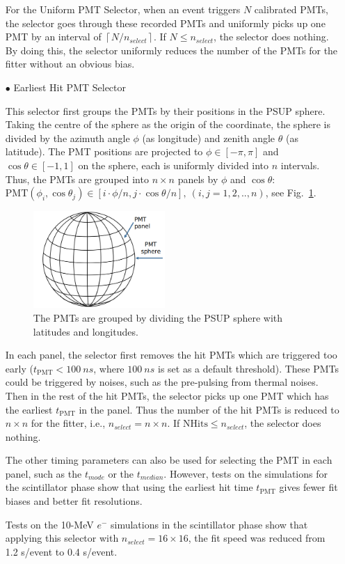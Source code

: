 \begin{itemize}
	For the Uniform PMT Selector, when an event triggers $N$ calibrated PMTs, the selector goes through these recorded PMTs and uniformly picks up one PMT by an interval of $\left \lceil{N/n_{select}}\right \rceil $. If $N\leq n_{select}$, the selector does nothing. By doing this, the selector uniformly reduces the number of the PMTs for the fitter without an obvious bias.
	
	\item[$\bullet$] Earliest Hit PMT Selector
	
	This selector first groups the PMTs by their positions in the PSUP sphere. Taking the centre of the sphere as the origin of the coordinate, the sphere is divided by the azimuth angle $\phi$ (as longitude) and zenith angle $\theta$ (as latitude). The PMT positions are projected to $\phi\in [-\pi,\pi]$ and $\cos\theta\in [-1, 1]$ on the sphere, each is uniformly divided into $n$ intervals. Thus, the PMTs are grouped into $n\times n$ panels by $\phi$ and $\cos\theta$: $\mathrm{PMT}(\phi_i,\cos\theta_j) \in [i\cdot\phi/n, j\cdot\cos\theta/n],~(i,j=1,2,..,n)$, see Fig.~\ref{GroupPMTs}. 
	\begin{figure}[!htb]
		\centering
		\includegraphics[width=5cm]{GroupPMTs.png}
		\caption{The PMTs are grouped by dividing the PSUP sphere with latitudes and longitudes.}
		\label{GroupPMTs}
	\end{figure}
	
	In each panel, the selector first removes the hit PMTs which are triggered too early ($t_\mathrm{PMT}<100~ns$, where $100~ns$ is set as a default threshold). These PMTs could be triggered by noises, such as the pre-pulsing from thermal noises. Then in the rest of the hit PMTs, the selector picks up one PMT which has the earliest $t_\mathrm{PMT}$ in the panel. Thus the number of the hit PMTs is reduced to $n\times n$ for the fitter, i.e., $n_{select}=n\times n$. If $\mathrm{NHits}\leq n_{select}$, the selector does nothing. 
	
	The other timing parameters can also be used for selecting the PMT in each panel, such as the $t_{mode}$ or the $t_{median}$. However, tests on the simulations for the scintillator phase show that using the earliest hit time $t_\mathrm{PMT}$ gives fewer fit biases and better fit resolutions.
	
	Tests on the 10-MeV $e^-$ simulations in the scintillator phase show that applying this selector with $n_{select}=16\times16$, the fit speed was reduced from 1.2 s/event to 0.4 s/event.
\end{itemize}

